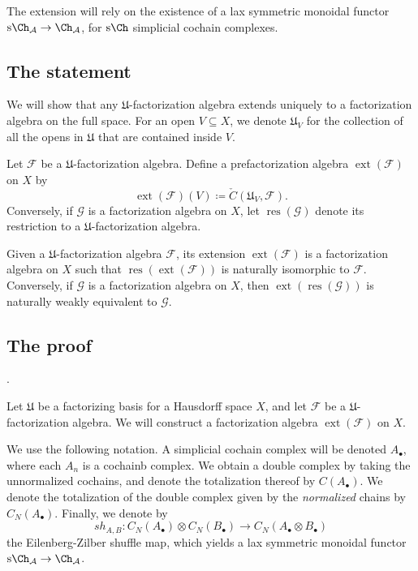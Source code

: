 The extension will rely on the existence of a lax symmetric monoidal functor $\mathrm{s} \Ch_{\mathcal{A} } \to \Ch_{\mathcal{A} } $, for $\mathrm{s} \Ch$ simplicial cochain complexes.

\subsection{The statement}

We will show that any $\mathfrak{U} $-factorization algebra extends uniquely to a factorization algebra on the full space. For an open $V\subseteq X$, we denote $\mathfrak{U} _V$ for the collection of all the opens in $\mathfrak{U} $ that are contained inside $V$.

Let $\mathcal{F} $ be a $\mathfrak{U} $-factorization algebra. Define a prefactorization algebra $\operatorname{ext} (\mathcal{F} )$ on $X$ by
\[
	\operatorname{ext} (\mathcal{F} )(V) \coloneqq \check{C}(\mathfrak{U} _V,\mathcal{F} )
.\]
Conversely, if $\mathcal{G} $ is a factorization algebra on $X$, let $\operatorname{res} (\mathcal{G} )$ denote its restriction to a $\mathfrak{U} $-factorization algebra.

\begin{proposition}\label{prp:6-2-2}
	Given a $\mathfrak{U} $-factorization algebra $\mathcal{F} $, its extension $\operatorname{ext} (\mathcal{F} )$ is a factorization algebra on $X$ such that $\operatorname{res} (\operatorname{ext} (\mathcal{F} ))$ is naturally isomorphic to $\mathcal{F} $. Conversely, if $\mathcal{G} $ is a factorization algebra on $X$, then $\operatorname{ext} (\operatorname{res} (\mathcal{G} ))$ is naturally weakly equivalent to $\mathcal{G} $.
\end{proposition}

\subsection{The proof}.

Let $\mathfrak{U} $ be a factorizing basis for a Hausdorff space $X$, and let $\mathcal{F} $ be a $\mathfrak{U} $-factorization algebra. We will construct a factorization algebra $\operatorname{ext} (\mathcal{F} )$ on $X$.

We use the following notation. A simplicial cochain complex will be denoted $A_{\bullet} $, where each $A_n$ is a cochainb complex. We obtain a double complex by taking the unnormalized cochains, and denote the totalization thereof by $C(A_{\bullet} )$. We denote the totalization of the double complex given by the \emph{normalized} chains by $C_N(A_{\bullet} )$. Finally, we denote by
\[
	sh_{A,B} : C_N(A_{\bullet} )\otimes C_N(B_{\bullet} ) \to C_N(A_{\bullet} \otimes B_{\bullet} )
\]
the Eilenberg-Zilber shuffle map, which yields a lax symmetric monoidal functor $\mathrm{s} \Ch_{\mathcal{A} } \to \Ch_{\mathcal{A} } $.

